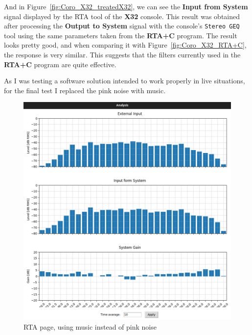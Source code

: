 And in Figure~\ref{fig:Coro_X32_treatedX32}, we can see the \textbf{Input from System} signal displayed by the RTA tool of the \textbf{X32} console. This result was obtained after processing the \textbf{Output to System} signal with the console's \texttt{Stereo GEQ} tool using the same parameters taken from the \textbf{RTA+C} program. The result looks pretty good, and when comparing it with Figure~\ref{fig:Coro_X32_RTA+C}, the response is very similar. This suggests that the filters currently used in the \textbf{RTA+C} program are quite effective.

As I was testing a software solution intended to work properly in live situations, for the final test I replaced the pink noise with music.

\begin{figure}[H]
	\centering
	\includegraphics[width=0.8
	\linewidth]{Figures/Coro_Music_EQ_X32.png}
	\caption{RTA page, using music instead of pink noise}
	\label{fig:Coro_RTA_music}
\end{figure}

